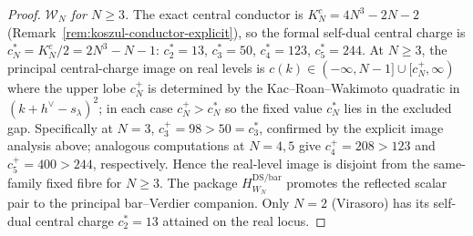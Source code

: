 \begin{proof}
\emph{$\mathcal{W}_N$ for $N \geq 3$.} The exact central conductor is
$K_N^c = 4N^3 - 2N - 2$
\textup{(}Remark~\ref{rem:koszul-conductor-explicit}\textup{)}, so
the formal self-dual central charge is $c^*_N = K_N^c/2 = 2N^3 - N - 1$:
$c^*_2 = 13$, $c^*_3 = 50$, $c^*_4 = 123$, $c^*_5 = 244$. At $N \geq 3$,
the principal central-charge image on real levels is
$c(k) \in (-\infty, N-1] \cup [c^+_N, \infty)$ where the upper lobe
$c^+_N$ is determined by the Kac--Roan--Wakimoto quadratic in
$(k + h^\vee - s_\lambda)^2$; in each case $c^+_N > c^*_N$ so the
fixed value $c^*_N$ lies in the excluded gap. Specifically at
$N = 3$, $c^+_3 = 98 > 50 = c^*_3$, confirmed by the explicit image
analysis above; analogous computations at $N = 4, 5$ give
$c^+_4 = 208 > 123$ and $c^+_5 = 400 > 244$, respectively.  Hence the
real-level image is disjoint from the same-family fixed fibre for
$N\geq3$.  The package $H_{W_N}^{\mathrm{DS/bar}}$
promotes the reflected scalar pair to the principal bar--Verdier
companion.
Only $N = 2$ (Virasoro) has its self-dual central charge
$c^*_2 = 13$ attained on the real locus.
\end{proof}

